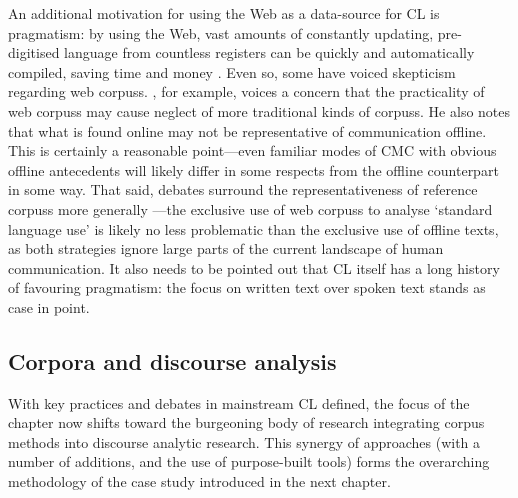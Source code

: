 An additional motivation for using the Web as a data\hyp{}source for \gls{CL} is pragmatism: by using the Web, vast amounts of constantly updating, pre\hyp{}digitised language from countless registers can be quickly and automatically compiled, saving time and money \cite{baroni_wacky_2009}. Even so, some have voiced skepticism regarding web \glspl{corpus}. \textcite{leech_new_2006}, for example, voices a concern that the practicality of web \glspl{corpus} may cause neglect of more traditional kinds of \glspl{corpus}. He also notes that what is found online may not be representative of communication offline. This is certainly a reasonable point---even familiar \glspl{mode} of \gls{CMC} with obvious offline antecedents will likely differ in some respects from the offline counterpart in some way. That said, debates surround the representativeness of reference \glspl{corpus} more generally \cite{baker_acceptable_2012}---the exclusive use of web \glspl{corpus} to analyse `standard language use' is likely no less problematic than the exclusive use of offline texts, as both strategies ignore large parts of the current landscape of human communication. It also needs to be pointed out that \gls{CL} itself has a long history of favouring pragmatism: the focus on written text over spoken text \cite[with even contemporary general \glspl{corpus} such as the BNC containing 90 per cent written text due to the expense associated with transcription---see][]{bnc_reference_2016,leech1992100} stands as case in point.


\subsection{Corpora and discourse analysis} \label{sect:cads}

With key practices and debates in mainstream \gls{CL} defined, the focus of the chapter now shifts toward the burgeoning body of research integrating corpus methods into discourse analytic research. This synergy of approaches (with a number of additions, and the use of purpose-built tools) forms the overarching methodology of the case study introduced in the next chapter.

